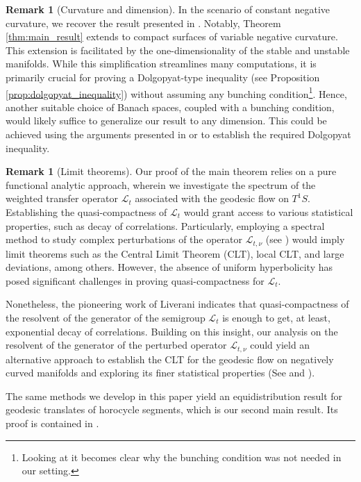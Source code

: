 \documentclass[11pt,letterpaper]{amsart}
\theoremstyle{definition}
\newtheorem{remark}[theorem]{Remark}
\begin{document}
\begin{remark}[Curvature and dimension]
In the scenario of constant negative curvature, we recover the result presented in \cite{LeSa}. Notably, Theorem \ref{thm:main_result} extends to compact surfaces of variable negative curvature. This extension is facilitated by the one-dimensionality of the stable and unstable manifolds. While this simplification streamlines many computations, it is primarily crucial for proving a Dolgopyat-type inequality (see Proposition \ref{prop:dolgopyat_inequality}) without assuming any bunching condition\footnote{Looking at \cite[Remark 7.6]{GiLiPo} it becomes clear why the bunching condition was not needed in our setting.}. Hence, another suitable choice of Banach spaces, coupled with a bunching condition, would likely suffice to generalize our result to any dimension. This could be achieved using the arguments presented in \cite{AdBa} or \cite{GiLiPo} to establish the required Dolgopyat inequality.
\end{remark}

\begin{remark}[Limit theorems]
Our proof of the main theorem relies on a pure functional analytic approach, wherein we investigate the spectrum of the weighted transfer operator $\mathcal{L}_t$ associated with the geodesic flow on $T^1S$. Establishing the quasi-compactness of $\mathcal{L}_t$ would grant access to various statistical properties, such as decay of correlations. Particularly, employing a spectral method to study complex perturbations of the operator $\mathcal{L}_{t,\nu}$ (see \cite{Gou}) would imply limit theorems such as the Central Limit Theorem (CLT), local CLT, and large deviations, among others. However, the absence of uniform hyperbolicity has posed significant challenges in proving quasi-compactness for $\mathcal{L}_t$.

Nonetheless, the pioneering work of Liverani \cite{Liv} indicates that quasi-compactness of the resolvent of the generator of the semigroup $\mathcal{L}_t$ is enough to get, at least, exponential decay of correlations. Building on this insight, our analysis on the resolvent of the generator of the perturbed operator $\mathcal{L}_{t,\nu}$ could yield an alternative approach to establish the CLT for the geodesic flow on negatively curved manifolds and exploring its finer statistical properties (See  and ). 
\end{remark}

The same methods we develop in this paper yield an equidistribution result for geodesic translates of horocycle segments, which is our second main result. Its proof is contained in .
\end{document}
